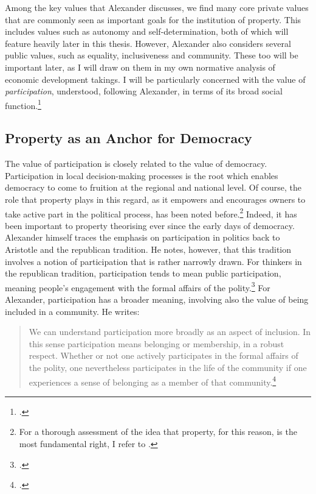 {Among the key values that Alexander discusses, we find many core private values that are commonly seen as important goals for the institution of property. This includes values such as autonomy and self-determination, both of which will feature heavily later in this thesis. However, Alexander also considers several public values, such as equality, inclusiveness and community. These too will be important later, as I will draw on them in my own normative analysis of economic development takings. I will be particularly concerned with the value of {\it participation}, understood, following Alexander, in terms of its broad social function.\footcite[1275-1276]{alexander14}
}

\subsection{Property as an Anchor for Democracy}

The value of participation is closely related to the value of democracy. Participation in local decision-making processes is the root which enables democracy to come to fruition at the regional and national level. Of course, the role that property plays in this regard, as it empowers and encourages owners to take active part in the political process, has been noted before.\footnote{For a thorough assessment of the idea that property, for this reason, is the most fundamental right, I refer to \cite{rose96}.} Indeed, it has been important to property theorising ever since the early days of democracy. Alexander himself traces the emphasis on participation in politics back to Aristotle and the republican tradition. He notes, however, that this tradition involves a notion of participation that is rather narrowly drawn. For thinkers in the republican tradition, participation tends to mean public participation, meaning people's engagement with the formal affairs of the polity.\footcite[1275]{alexander14} For Alexander, participation has a broader meaning, involving also the value of being included in a community. He writes:

\begin{quote}
We can understand participation more broadly as an aspect of inclusion. In this sense participation means belonging or membership, in a robust respect. Whether or not one actively participates in the formal affairs of the polity, one nevertheless participates in the life of the community if one experiences a sense of belonging as a member of that community.\footcite[1275]{alexander14}
\end{quote}


